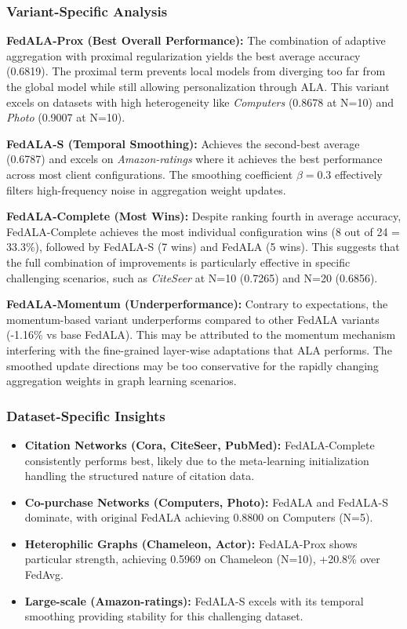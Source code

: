 \documentclass[10pt,conference,compsocconf,letterpaper]{IEEEtran}
\begin{document}
\subsubsection{Variant-Specific Analysis}

\textbf{FedALA-Prox (Best Overall Performance):} The combination of adaptive aggregation with proximal regularization yields the best average accuracy (0.6819). The proximal term prevents local models from diverging too far from the global model while still allowing personalization through ALA. This variant excels on datasets with high heterogeneity like \textit{Computers} (0.8678 at N=10) and \textit{Photo} (0.9007 at N=10).

\textbf{FedALA-S (Temporal Smoothing):} Achieves the second-best average (0.6787) and excels on \textit{Amazon-ratings} where it achieves the best performance across most client configurations. The smoothing coefficient $\beta=0.3$ effectively filters high-frequency noise in aggregation weight updates.

\textbf{FedALA-Complete (Most Wins):} Despite ranking fourth in average accuracy, FedALA-Complete achieves the most individual configuration wins (8 out of 24 = 33.3\%), followed by FedALA-S (7 wins) and FedALA (5 wins). This suggests that the full combination of improvements is particularly effective in specific challenging scenarios, such as \textit{CiteSeer} at N=10 (0.7265) and N=20 (0.6856).

\textbf{FedALA-Momentum (Underperformance):} Contrary to expectations, the momentum-based variant underperforms compared to other FedALA variants (-1.16\% vs base FedALA). This may be attributed to the momentum mechanism interfering with the fine-grained layer-wise adaptations that ALA performs. The smoothed update directions may be too conservative for the rapidly changing aggregation weights in graph learning scenarios.

\subsubsection{Dataset-Specific Insights}
\begin{itemize}
    \item \textbf{Citation Networks (Cora, CiteSeer, PubMed):} FedALA-Complete consistently performs best, likely due to the meta-learning initialization handling the structured nature of citation data.
    \item \textbf{Co-purchase Networks (Computers, Photo):} FedALA and FedALA-S dominate, with original FedALA achieving 0.8800 on Computers (N=5).
    \item \textbf{Heterophilic Graphs (Chameleon, Actor):} FedALA-Prox shows particular strength, achieving 0.5969 on Chameleon (N=10), +20.8\% over FedAvg.
    \item \textbf{Large-scale (Amazon-ratings):} FedALA-S excels with its temporal smoothing providing stability for this challenging dataset.
\end{itemize}
\end{document}
